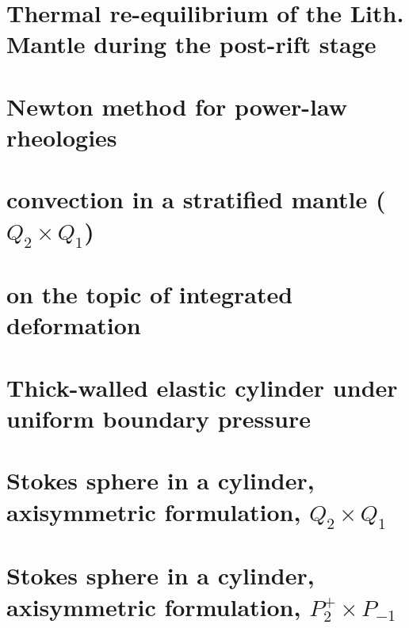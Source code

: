 \documentclass[a4paper,11pt]{report}
\begin{document}
\chapter{Thermal re-equilibrium of the Lith. Mantle during the post-rift stage \label{f86}}

\chapter{Newton method for power-law rheologies \label{f87}}

\chapter{convection in a stratified mantle ($Q_2\times Q_1$) \label{f88}}

\chapter{on the topic of integrated deformation	\label{f89}}

\chapter{Thick-walled elastic cylinder under uniform boundary pressure \label{f90}}

\chapter{Stokes sphere in a cylinder, axisymmetric formulation, $Q_2\times Q_1$ \label{f91}}

\chapter{Stokes sphere in a cylinder, axisymmetric formulation, $P_2^+\times P_{-1}$ \label{f92}}
\end{document}
